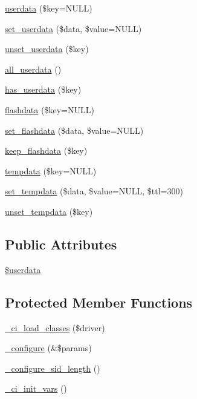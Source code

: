 \begin{DoxyCompactItemize}
\mbox{\hyperlink{class_c_i___session_ab10006d10762845f93392ef4c2884df6}{userdata}} (\$key=N\+U\+LL)
\item 
\mbox{\hyperlink{class_c_i___session_a17de7d10cbbe8162d16bfc43083e74aa}{set\+\_\+userdata}} (\$data, \$value=N\+U\+LL)
\item 
\mbox{\hyperlink{class_c_i___session_a8d3a4935d2ff2088f11654445d9a0122}{unset\+\_\+userdata}} (\$key)
\item 
\mbox{\hyperlink{class_c_i___session_a974fa60ddc074b14ffcc78ef9902bc5c}{all\+\_\+userdata}} ()
\item 
\mbox{\hyperlink{class_c_i___session_a25f39652bb0f716817e5e1e778729bea}{has\+\_\+userdata}} (\$key)
\item 
\mbox{\hyperlink{class_c_i___session_acc27ddf9dd242d2c887eca2504136cff}{flashdata}} (\$key=N\+U\+LL)
\item 
\mbox{\hyperlink{class_c_i___session_a177029809f00f95b6a83cc137a45ff4e}{set\+\_\+flashdata}} (\$data, \$value=N\+U\+LL)
\item 
\mbox{\hyperlink{class_c_i___session_a1e25514ba8dbd132db06cbedc6412158}{keep\+\_\+flashdata}} (\$key)
\item 
\mbox{\hyperlink{class_c_i___session_a0bd79cb5948499f7c43adbe29f0c24a9}{tempdata}} (\$key=N\+U\+LL)
\item 
\mbox{\hyperlink{class_c_i___session_a51cac8d017a43882b365aa45745dc892}{set\+\_\+tempdata}} (\$data, \$value=N\+U\+LL, \$ttl=300)
\item 
\mbox{\hyperlink{class_c_i___session_a79d3115c19f6dfa873ca5f3a7929f24a}{unset\+\_\+tempdata}} (\$key)
\end{DoxyCompactItemize}
\subsection*{Public Attributes}
\begin{DoxyCompactItemize}
\item 
\mbox{\hyperlink{class_c_i___session_af70e594e86a310311c717b13e6ecac00}{\$userdata}}
\end{DoxyCompactItemize}
\subsection*{Protected Member Functions}
\begin{DoxyCompactItemize}
\item 
\mbox{\hyperlink{class_c_i___session_ae4203f92a9f8a01d2498649f79acb0f9}{\+\_\+ci\+\_\+load\+\_\+classes}} (\$driver)
\item 
\mbox{\hyperlink{class_c_i___session_a71e7f49b0627505b4a7dbc8ce368279b}{\+\_\+configure}} (\&\$params)
\item 
\mbox{\hyperlink{class_c_i___session_af85033c81c047ceeec26aa087d5ba459}{\+\_\+configure\+\_\+sid\+\_\+length}} ()
\item 
\mbox{\hyperlink{class_c_i___session_a143bee24c36e5fd566b58bed89cd8463}{\+\_\+ci\+\_\+init\+\_\+vars}} ()
\end{DoxyCompactItemize}
